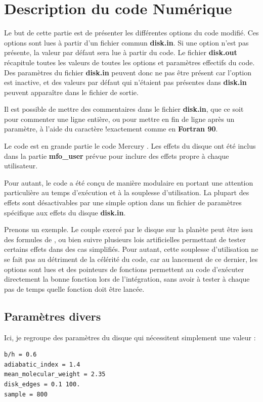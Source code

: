 \chapter{Description du code Numérique}\label{sec:nbody-readme}
Le but de cette partie est de présenter les différentes options du code modifié. Ces options sont lues à partir d'un fichier commun \textbf{disk.in}. Si une option n'est pas présente, la valeur par défaut sera lue à partir du code. Le fichier \textbf{disk.out} récapitule toutes les valeurs de toutes les options et paramètres effectifs du code. Des paramètres du fichier \textbf{disk.in} peuvent donc ne pas être présent car l'option est inactive, et des valeurs par défaut qui n'étaient pas présentes dans \textbf{disk.in} peuvent apparaître dans le fichier de sortie.

Il est possible de mettre des commentaires dans le fichier \textbf{disk.in}, que ce soit pour commenter une ligne entière, ou pour mettre en fin de ligne après un paramètre, à l'aide du caractère \og !\fg exactement comme en \textbf{Fortran 90}.

Le code est en grande partie le code Mercury \cite{chambers1999hybrid}. Les effets du disque ont été inclus dans la partie \textbf{mfo\_user} prévue pour inclure des effets propre à chaque utilisateur. 

Pour autant, le code a été conçu de manière modulaire en portant une attention particulière au temps d'exécution et à la
souplesse d'utilisation. La plupart des effets sont désactivables par une simple option dans un fichier de paramètres spécifique
aux effets du disque \textbf{disk.in}. 

Prenons un exemple. Le couple exercé par le disque sur la planète peut être issu des formules de \cite{paardekooper2011torque}, ou bien suivre plusieurs lois artificielles permettant de tester certains effets dans des cas simplifiés. Pour autant, cette souplesse d'utilisation ne se fait pas au détriment de la célérité du code, car au lancement de ce dernier, les options sont lues et des pointeurs de fonctions permettent au code d'exécuter directement la bonne fonction lors de l'intégration, sans avoir à tester à chaque pas de temps quelle fonction doit être lancée. 

\section{Paramètres divers}
Ici, je regroupe des paramètres du disque qui nécessitent simplement une valeur : 
\begin{verbatim}
b/h = 0.6
adiabatic_index = 1.4
mean_molecular_weight = 2.35
disk_edges = 0.1 100.
sample = 800
\end{verbatim}

